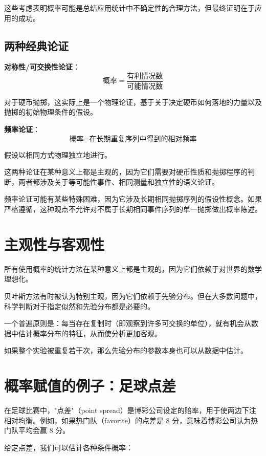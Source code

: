 这些考虑表明概率可能是总结应用统计中不确定性的合理方法，但最终证明在于应用的成功。

\subsection{两种经典论证}

\textbf{对称性/可交换性论证}：
\[
\text{概率} = \frac{\text{有利情况数}}{\text{可能情况数}}
\]

对于硬币抛掷，这实际上是一个物理论证，基于关于决定硬币如何落地的力量以及抛掷的初始物理条件的假设。

\textbf{频率论证}：
\[
\text{概率} = \text{在长期重复序列中得到的相对频率}
\]

假设以相同方式物理独立地进行。

这两种论证在某种意义上都是主观的，因为它们需要对硬币性质和抛掷程序的判断，两者都涉及关于等可能性事件、相同测量和独立性的语义论证。

频率论证可能有某些特殊困难，因为它涉及长期相同抛掷序列的假设性概念。如果严格遵循，这种观点不允许对不属于长期相同事件序列的单一抛掷做出概率陈述。

\section{主观性与客观性}

所有使用概率的统计方法在某种意义上都是主观的，因为它们依赖于对世界的数学理想化。

贝叶斯方法有时被认为特别主观，因为它们依赖于先验分布。但在大多数问题中，科学判断对于指定似然和先验分布都是必要的。

一个普遍原则是：每当存在复制时（即观察到许多可交换的单位），就有机会从数据中估计概率分布的特征，从而使分析更加客观。

如果整个实验被重复若干次，那么先验分布的参数本身也可以从数据中估计。

\section{概率赋值的例子：足球点差}

在足球比赛中，"点差"（point spread）是博彩公司设定的赔率，用于使两边下注相对均衡。例如，如果热门队（favorite）的点差是 8 分，意味着博彩公司认为热门队平均会赢 8 分。

给定点差，我们可以估计各种条件概率：

